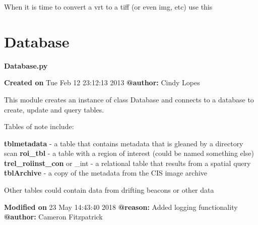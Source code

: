 \documentclass[letterpaper,10pt,openany,oneside]{sphinxmanual}
\begin{document}
\begin{fulllineitems}
\begin{fulllineitems}
\end{fulllineitems}


\begin{fulllineitems}
\label{code:Image.Image.vrt2RealImg}
When it is time to convert a vrt to a tiff (or even img, etc) use this

\end{fulllineitems}


\end{fulllineitems}



\section{Database}
\label{code:database}\label{code:module-Database}
\textbf{Database.py}

\textbf{Created on} Tue Feb 12 23:12:13 2013 \textbf{@author:} Cindy Lopes

This module creates an instance of class Database and connects to a database to
create, update and query tables.

Tables of note include:

\textbf{tblmetadata} - a table that contains metadata that is gleaned by a directory scan
\textbf{roi\_tbl} - a table with a region of interest (could be named something else)
\textbf{trel\_roiinst\_con} or \_int - a relational table that results from a spatial query
\textbf{tblArchive} - a copy of the metadata from the CIS image archive

Other tables could contain data from drifting beacons or other data

\textbf{Modified on} 23 May 14:43:40 2018 \textbf{@reason:} Added logging functionality \textbf{@author:} Cameron Fitzpatrick
\end{document}
